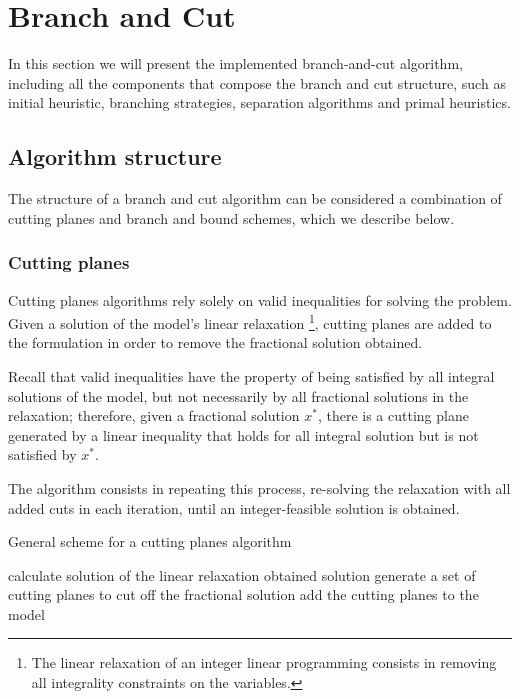 
\section{Branch and Cut}
\label{sec:bnc}

In this section we will present the implemented branch-and-cut algorithm, including all the components that compose the branch and cut structure, such as initial heuristic, branching strategies, separation algorithms and primal heuristics.

\subsection{Algorithm structure}

The structure of a branch and cut algorithm can be considered a combination of cutting planes and branch and bound schemes, which we describe below.

\subsubsection*{Cutting planes}

Cutting planes algorithms rely solely on valid inequalities for solving the problem. Given a solution of the model's linear relaxation \footnote{The linear relaxation of an integer linear programming consists in removing all integrality constraints on the variables.}, cutting planes are added to the formulation in order to remove the fractional solution obtained. 

Recall that valid inequalities have the property of being satisfied by all integral solutions of the model, but not necessarily by all fractional solutions in the relaxation; therefore, given a fractional solution $x^*$, there is a cutting plane generated by a linear inequality that holds for all integral solution but is not satisfied by $x^*$. 

The algorithm consists in repeating this process, re-solving the relaxation with all added cuts in each iteration, until an integer-feasible solution is obtained.

\begin{algorithm}
\caption{General scheme for a cutting planes algorithm}
\label{alg:cuttingplanes}

\begin{algorithmic}

\LOOP
	\STATE calculate solution of the linear relaxation
		\RETURN obtained solution
	\ENDIF
	\STATE generate a set of cutting planes to cut off the fractional solution
	\STATE add the cutting planes to the model
\ENDLOOP

\end{algorithmic}
\end{algorithm}

